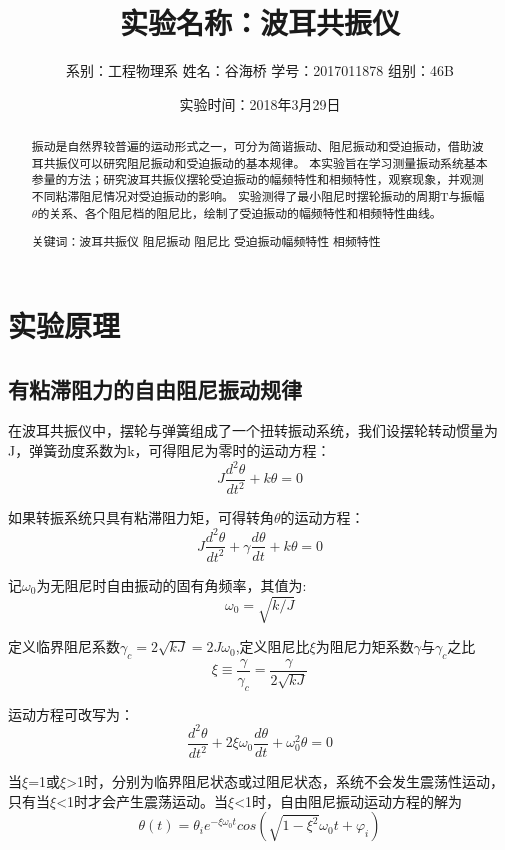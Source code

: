 \documentclass[UTF8]{ctexart}
\title{实验名称：波耳共振仪}
\author{系别：工程物理系 \qquad 姓名：谷海桥 \qquad 学号：2017011878 \qquad 组别：46B}
\date{实验时间：2018年3月29日}
\renewcommand{\baselinestretch}{1.75}
\begin{document}
    \maketitle
    \begin{abstract}
        振动是自然界较普遍的运动形式之一，可分为简谐振动、阻尼振动和受迫振动，借助波耳共振仪可以研究阻尼振动和受迫振动的基本规律。
        本实验旨在学习测量振动系统基本参量的方法；研究波耳共振仪摆轮受迫振动的幅频特性和相频特性，观察现象，并观测不同粘滞阻尼情况对受迫振动的影响。
        实验测得了最小阻尼时摆轮振动的周期T与振幅$\theta$的关系、各个阻尼档的阻尼比，绘制了受迫振动的幅频特性和相频特性曲线。
        \begin{center}
            关键词：波耳共振仪 \quad 阻尼振动 \quad 阻尼比 \quad 受迫振动\quad 幅频特性 \quad 相频特性
        \end{center}
    \end{abstract}
    \section{实验原理}
        \subsection{有粘滞阻力的自由阻尼振动规律}
        \renewcommand{\baselinestretch}{1}
            在波耳共振仪中，摆轮与弹簧组成了一个扭转振动系统，我们设摆轮转动惯量为J，弹簧劲度系数为k，可得阻尼为零时的运动方程：
            $$ J\frac{d^{2}\theta}{dt^{2}}+k\theta=0 $$

            如果转振系统只具有粘滞阻力矩，可得转角$\theta$的运动方程：
            $$ J\frac{d^{2}\theta}{dt^{2}}+\gamma\frac{d\theta}{dt}+k\theta=0$$

            记$\omega_{0}$为无阻尼时自由振动的固有角频率，其值为:
            $$\omega_{0}=\sqrt{k/J}$$

            定义临界阻尼系数$\gamma_{c}=2\sqrt{kJ}=2J\omega_{0}$,定义阻尼比$\xi$为阻尼力矩系数$\gamma$与$\gamma_{c}$之比
            $$\xi\equiv\frac{\gamma}{\gamma_{c}}=\frac{\gamma}{2\sqrt{kJ}}$$

            运动方程可改写为：
            $$\frac{d^{2}\theta}{dt^{2}}+2\xi\omega_{0}\frac{d\theta}{dt}+\omega_{0}^{2}\theta=0$$

            当$\xi$=1或$\xi$>1时，分别为临界阻尼状态或过阻尼状态，系统不会发生震荡性运动，只有当$\xi$<1时才会产生震荡运动。当$\xi$<1时，自由阻尼振动运动方程的解为
            $$\theta(t)=\theta_{i}e^{-\xi\omega_{0}t}cos(\sqrt{1-\xi^{2}}\omega_{0}t+\varphi_{i})$$
\end{document}
